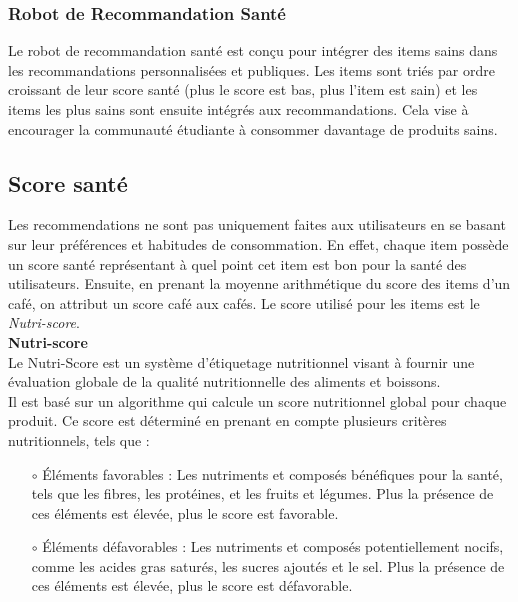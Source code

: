 \documentclass[11pt]{article}
\begin{document}
\subsubsection{Robot de Recommandation Santé}
Le robot de recommandation santé est conçu pour intégrer des items sains dans les recommandations personnalisées et publiques. Les items sont triés par ordre croissant de leur score santé (plus le score est bas, plus l'item est sain) et les items les plus sains sont ensuite intégrés aux recommandations. Cela vise à encourager la communauté étudiante à consommer davantage de produits sains.

\subsection{Score santé}
Les recommendations ne sont pas uniquement faites aux utilisateurs en se basant sur leur préférences et habitudes de consommation. En effet, chaque item possède un score santé représentant à quel point cet item est bon pour la santé des utilisateurs. Ensuite, en prenant la moyenne arithmétique du score des items d'un café, on attribut un score café aux cafés. Le score utilisé pour les items est le \textit{Nutri-score}.\\

\textbf{Nutri-score}\\

Le Nutri-Score est un système d'étiquetage nutritionnel visant à fournir une évaluation globale de la qualité nutritionnelle des aliments et boissons.\\

Il est basé sur un algorithme qui calcule un score nutritionnel global pour chaque produit. Ce score est déterminé en prenant en compte plusieurs critères nutritionnels, tels que :\\

\begin{itemize}
    \item[$\circ$] Éléments favorables : Les nutriments et composés bénéfiques pour la santé, tels que les fibres, les protéines, et les fruits et légumes. Plus la présence de ces éléments est élevée, plus le score est favorable.\\
    
    \item[$\circ$] Éléments défavorables : Les nutriments et composés potentiellement nocifs, comme les acides gras saturés, les sucres ajoutés et le sel. Plus la présence de ces éléments est élevée, plus le score est défavorable.\\
\end{itemize}
\end{document}
